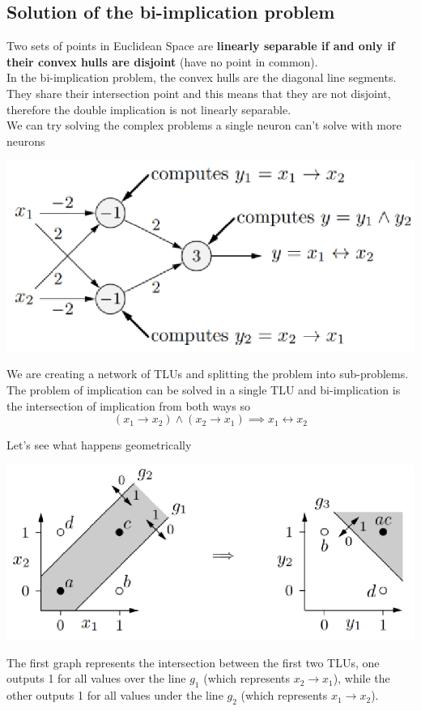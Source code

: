 \newpage

\subsection{Solution of the bi-implication problem}
Two sets of points in Euclidean Space are \textbf{linearly separable if and only if their convex hulls are disjoint} (have no point in common).\\

In the bi-implication problem, the convex hulls are the diagonal line segments. They share their intersection point and this means that they are not disjoint, therefore the double implication is not linearly separable.\\

We can try solving the complex problems a single neuron can't solve with more neurons
\begin{center}
	\includegraphics[width=0.7\columnwidth]{img/NN/TLU8}
\end{center}
We are creating a network of TLUs and splitting the problem into sub-problems.\\

The problem of implication can be solved in a single TLU and bi-implication is the intersection of implication from both ways so
$$ (x_1 \rightarrow x_2) \wedge (x_2 \rightarrow x_1) \implies x_1 \leftrightarrow x_2$$

\newpage

Let's see what happens geometrically
\begin{center}
	\includegraphics[width=0.85\columnwidth]{img/NN/TLU9}
\end{center}
The first graph represents the intersection between the first two TLUs, one outputs 1 for all values over the line $g_1$ (which represents $x_2 \rightarrow x_1$), while the other outputs 1 for all values under the line $g_2$ (which represents $x_1 \rightarrow x_2$).\\

